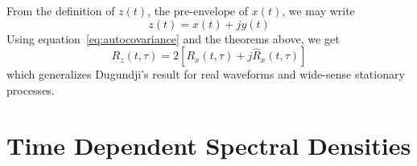 \documentclass{article}
\begin{document}
From the definition of $z (t)$, the pre-envelope of $x (t)$, we may write
\begin{equation}
  z (t) = x (t) + jy (t) \label{eq:preenvelope}
\end{equation}
Using equation~\eqref{eq:autocovariance} and the theorems above, we get
\begin{equation}
  R_z (t, \tau) = 2 [R_x (t, \tau) + j \hat{R}_x (t, \tau)]
  \label{eq:preenvelope_autocov}
\end{equation}
which generalizes Dugundji's result for real waveforms and wide-sense
stationary processes.

\section{Time Dependent Spectral Densities}
\end{document}

